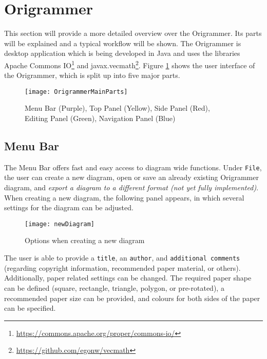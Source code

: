 
\section{Origrammer}
\label{sec:origrammer}

This section will provide a more detailed overview over the Origrammer. Its parts will be explained and a typical workflow will be shown. The Origrammer is desktop application which is being developed in Java and uses the libraries Apache Commons IO\footnote{\url{https://commons.apache.org/proper/commons-io/}} and javax.vecmath\footnote{\url{https://github.com/egonw/vecmath}}. Figure \ref{fig:origrammerMain} shows the user interface of the Origrammer, which is split up into five major parts.

\begin{figure}[htbp]
	\centering
	\texttt{[image: OrigrammerMainParts]}
	\caption{Menu Bar (Purple), Top Panel (Yellow), Side Panel (Red),\\ Editing Panel (Green), Navigation Panel (Blue)}
	\label{fig:origrammerMain}
\end{figure}

\subsection{Menu Bar}

The Menu Bar offers fast and easy access to diagram wide functions. Under \texttt{File}, the user can create a new diagram, open or save an already existing Origrammer diagram, and \emph{export a diagram to a different format (not yet fully implemented)}. When creating a new diagram, the following panel appears, in which several settings for the diagram can be adjusted.

\begin{figure}[htbp]
	\centering
	\texttt{[image: newDiagram]}
	\caption{Options when creating a new diagram}
	\label{fig:newDiagram}
\end{figure}

\noindent The user is able to provide a \texttt{title}, an \texttt{author}, and \texttt{additional comments} (regarding copyright information, recommended paper material, or others). Additionally, paper related settings can be changed. The required paper shape can be defined (square, rectangle, triangle, polygon, or pre-rotated), a recommended paper size can be provided, and colours for both sides of the paper can be specified.


